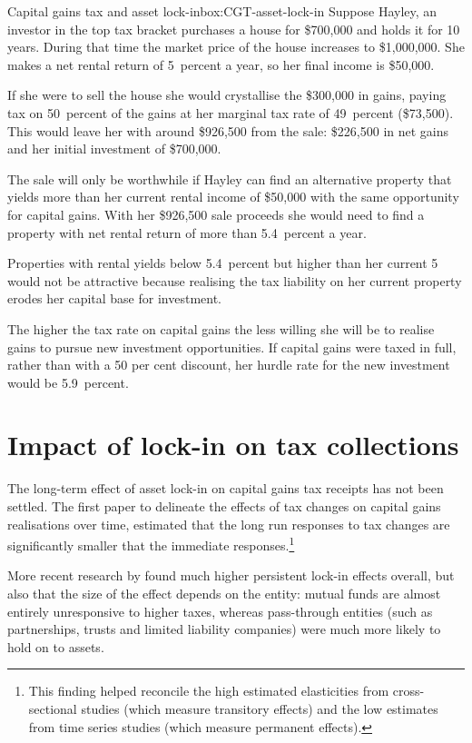 \begin{subappendices}
\begin{smallbox}[!hp]{Capital gains tax and asset lock-in}{box:CGT-asset-lock-in}
Suppose Hayley, an investor in the top tax bracket purchases a house for \$700,000 and holds it for 10 years. During that time the market price of the house increases to \$1,000,000. She makes a net rental return of 5~percent a year, so her  final income is \$50,000. 

If she were to sell the house she would crystallise the \$300,000 in gains, paying tax on 50~percent of the gains at her marginal tax rate of 49~percent (\$73,500). This would leave her with around \$926,500 from the sale: \$226,500 in net gains and her initial investment of \$700,000. 

The sale will only be worthwhile if Hayley can find an alternative property that yields more than her current rental income of \$50,000  with the same opportunity for capital gains. With her \$926,500 sale proceeds she would need to find a property with net rental return of more than 5.4~percent a year. 

Properties with rental yields below 5.4~percent but higher than her current 5 would not be attractive because realising the tax liability on her current property erodes her capital base for investment.  

The higher the tax rate on capital gains the less willing she will be to realise gains to pursue new investment opportunities. If capital gains were taxed in full, rather than with a 50 per cent discount, her hurdle rate for the new investment would be 5.9~percent.
\end{smallbox}
\clearpage

\section{Impact of lock-in on tax collections}

The long-term effect of asset lock-in on capital gains tax receipts has not been settled. The first paper to delineate the effects of tax changes on capital gains realisations over time, estimated that the long run responses to tax changes are significantly smaller that the immediate responses.\footnote{\textcite{BurmanRandolph1994} This finding helped reconcile the high estimated elasticities from cross-sectional studies (which measure transitory effects) and the low estimates from time series studies (which measure permanent effects).} 

More recent research by \textcite{CBO2012CapitalGainsTaxElasticity} found much higher persistent lock-in effects overall, but also that the size of the effect depends on the entity: mutual funds are almost entirely unresponsive to higher taxes, whereas pass-through entities (such as partnerships, trusts and limited liability companies) were much more likely to hold on to assets.


\end{subappendices}
